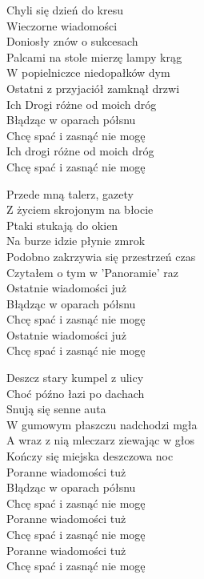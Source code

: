 
\begin{textn}
    Chyli się dzień do kresu\\
    Wieczorne wiadomości\\
    Doniosły znów o sukcesach\\
    Palcami na stole mierzę lampy krąg\\
    W popielniczce niedopałków dym\\
    Ostatni z przyjaciół zamknął drzwi\\
    Ich Drogi różne od moich dróg\\
    Błądząc w oparach półsnu\\
    Chcę spać i zasnąć nie mogę\\
    Ich drogi różne od moich dróg\\
    Chcę spać i zasnąć nie mogę

    Przede mną talerz, gazety\\
    Z życiem skrojonym na błocie\\
    Ptaki stukają do okien\\
    Na burze idzie płynie zmrok\\
    Podobno zakrzywia się przestrzeń czas\\
    Czytałem o tym w 'Panoramie' raz\\
    Ostatnie wiadomości już\\
    Błądząc w oparach półsnu\\
    Chcę spać i zasnąć nie mogę\\
    Ostatnie wiadomości już\\
    Chcę spać i zasnąć nie mogę

    Deszcz stary kumpel z ulicy\\
    Choć późno łazi po dachach\\
    Snują się senne auta\\
    W gumowym płaszczu nadchodzi mgła\\
    A wraz z nią mleczarz ziewając w głos\\
    Kończy się miejska deszczowa noc\\
    Poranne wiadomości tuż\\
    Błądząc w oparach półsnu\\
    Chcę spać i zasnąć nie mogę\\
    Poranne wiadomości tuż\\
    Chcę spać i zasnąć nie mogę\\
    Poranne wiadomości tuż\\
    Chcę spać i zasnąć nie mogę
\end{textn}
